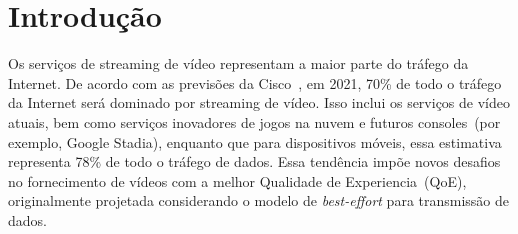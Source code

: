 \section{Introdução}
\label{ch:introduction}


\vspace{0.5cm}

Os serviços de streaming de vídeo representam a maior parte do tráfego da Internet. De acordo com as previsões da Cisco~\cite{cisco:forecast},
em 2021, 70\% de todo o tráfego da Internet será dominado por streaming de vídeo. Isso inclui os serviços de vídeo atuais, bem como serviços inovadores de jogos na nuvem e futuros consoles~(por exemplo, Google Stadia), enquanto que para dispositivos móveis, essa estimativa representa 78\% de todo o tráfego de dados. Essa tendência impõe novos desafios no fornecimento de vídeos com a melhor Qualidade de Experiencia~(QoE), originalmente projetada considerando o modelo de \textit{best-effort} para transmissão de dados.





